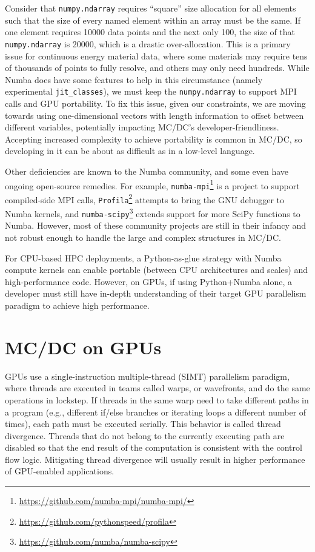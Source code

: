 Consider that \texttt{numpy.ndarray} requires ``square'' size allocation for all elements such that the size of every named element within an array must be the same.
If one element requires \num{10000} data points and the next only \num{100}, the size of that \texttt{numpy.ndarray} is \num{20000}, which is a drastic over-allocation.
This is a primary issue for continuous energy material data, where some materials may require tens of thousands of points to fully resolve, and others may only need hundreds.
While Numba does have some features to help in this circumstance (namely experimental \texttt{jit\_classes}), we must keep the \texttt{numpy.ndarray} to support MPI calls and GPU portability.
To fix this issue, given our constraints, we are moving towards using one-dimensional vectors with length information to offset between different variables, potentially impacting MC/DC's developer-friendliness.
Accepting increased complexity to achieve portability is common in MC/DC, so developing in it can be about as difficult as in a low-level language.

Other deficiencies are known to the Numba community, and some even have ongoing open-source remedies.
For example, \texttt{numba-mpi}\footnote{\url{https://github.com/numba-mpi/numba-mpi/}} is a project to support compiled-side MPI calls, \texttt{Profila}\footnote{\url{https://github.com/pythonspeed/profila}} attempts to bring the GNU debugger to Numba kernels, and \texttt{numba-scipy}\footnote{\url{https://github.com/numba/numba-scipy}} extends support for more SciPy functions to Numba.
However, most of these community projects are still in their infancy and not robust enough to handle the large and complex structures in MC/DC.

For CPU-based HPC deployments, a Python-as-glue strategy with Numba compute kernels can enable portable (between CPU architectures and scales) and high-performance code.
However, on GPUs, if using Python+Numba alone, a developer must still have in-depth understanding of their target GPU parallelism paradigm to achieve high performance.

\section{MC/DC on GPUs}

GPUs use a single-instruction multiple-thread (SIMT) parallelism paradigm, where threads are executed in teams called warps, or wavefronts, and do the same operations in lockstep. 
If threads in the same warp need to take different paths in a program (e.g., different if/else branches or iterating loops a different number of times), each path must be executed serially.
This behavior is called thread divergence.
Threads that do not belong to the currently executing path are disabled so that the end result of the computation is consistent with the control flow logic.
Mitigating thread divergence will usually result in higher performance of GPU-enabled applications.

